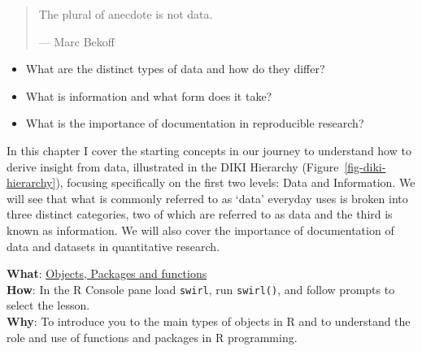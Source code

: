 \documentclass[
  letterpaper,
]{latex/krantz}
\providecommand{\tightlist}{%
  \setlength{\itemsep}{0pt}\setlength{\parskip}{0pt}}\usepackage{longtable,booktabs,array}
\begin{document}
\begin{quote}
The plural of anecdote is not data.

--- Marc Bekoff
\end{quote}

\begin{tcolorbox}[enhanced jigsaw, opacitybacktitle=0.6, breakable, colframe=quarto-callout-note-color-frame, arc=.35mm, left=2mm, leftrule=.75mm, title=\textcolor{quarto-callout-note-color}{\faInfo}\hspace{0.5em}{Essential questions}, opacityback=0, colback=white, toptitle=1mm, rightrule=.15mm, titlerule=0mm, bottomtitle=1mm, bottomrule=.15mm, coltitle=black, colbacktitle=quarto-callout-note-color!10!white, toprule=.15mm]

\begin{itemize}
\tightlist
\item
  What are the distinct types of data and how do they differ?
\item
  What is information and what form does it take?
\item
  What is the importance of documentation in reproducible research?
\end{itemize}

\end{tcolorbox}

In this chapter I cover the starting concepts in our journey to
understand how to derive insight from data, illustrated in the DIKI
Hierarchy (Figure~\ref{fig-diki-hierarchy}), focusing specifically on
the first two levels: Data and Information. We will see that what is
commonly referred to as `data' everyday uses is broken into three
distinct categories, two of which are referred to as data and the third
is known as information. We will also cover the importance of
documentation of data and datasets in quantitative research.

\begin{tcolorbox}[enhanced jigsaw, opacitybacktitle=0.6, breakable, colframe=quarto-callout-tip-color-frame, arc=.35mm, left=2mm, leftrule=.75mm, title=\textcolor{quarto-callout-tip-color}{\faLightbulb}\hspace{0.5em}{Interactive programming}, opacityback=0, colback=white, toptitle=1mm, rightrule=.15mm, titlerule=0mm, bottomtitle=1mm, bottomrule=.15mm, coltitle=black, colbacktitle=quarto-callout-tip-color!10!white, toprule=.15mm]
\textbf{What}: \href{https://github.com/lin380/swirl}{Objects, Packages
and functions}\\
\textbf{How}: In the R Console pane load \texttt{swirl}, run
\texttt{swirl()}, and follow prompts to select the lesson.\\
\textbf{Why}: To introduce you to the main types of objects in R and to
understand the role and use of functions and packages in R programming.
\end{tcolorbox}
\end{document}
